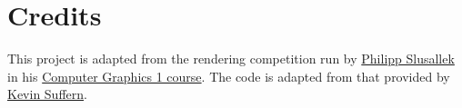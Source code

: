 \documentclass[addpoints]{exam}
\begin{document}
\section*{Credits}

This project is adapted from the rendering competition run by \href{https://graphics.cg.uni-saarland.de/people/slusallek.html}{Philipp Slusallek} in his \href{https://graphics.cg.uni-saarland.de/courses/cg1-2020/}{Computer Graphics 1 course}. The code is adapted from that provided by \href{http://www.raytracegroundup.com/}{Kevin Suffern}.
\end{document}
